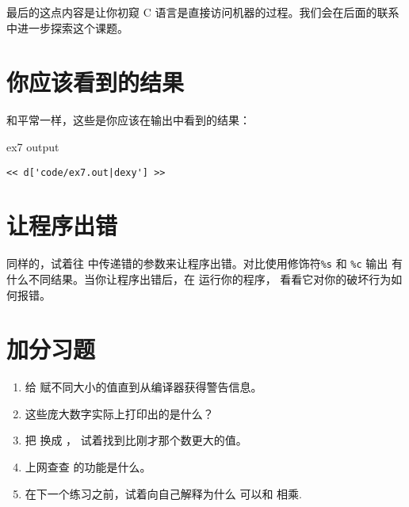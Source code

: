 最后的这点内容是让你初窥 C 语言是直接访问机器的过程。我们会在后面的联系中进一步探索这个课题。

\section{你应该看到的结果}

和平常一样，这些是你应该在输出中看到的结果：

\begin{code}{ex7 output}
\begin{lstlisting}
<< d['code/ex7.out|dexy'] >>
\end{lstlisting}
\end{code}


\section{让程序出错}

同样的，试着往  中传递错的参数来让程序出错。对比使用修饰符\verb|%s| 和 \verb|%c| 输出  有什么不同结果。当你让程序出错后，在  运行你的程序， 看看它对你的破坏行为如何报错。

\section{加分习题}

\begin{enumerate}
\item 给  赋不同大小的值直到从编译器获得警告信息。
\item 这些庞大数字实际上打印出的是什么？
\item 把  换成 ， 试着找到比刚才那个数更大的值。
\item 上网查查  的功能是什么。
\item 在下一个练习之前，试着向自己解释为什么  可以和  相乘.
\end{enumerate}

